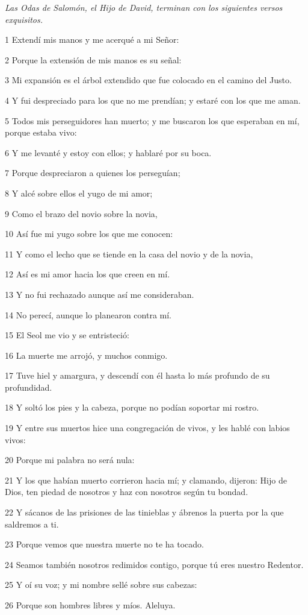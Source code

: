 \par \textit{Las Odas de Salomón, el Hijo de David, terminan con los siguientes versos exquisitos.}

\par 1 Extendí mis manos y me acerqué a mi Señor:
\par 2 Porque la extensión de mis manos es su señal:
\par 3 Mi expansión es el árbol extendido que fue colocado en el camino del Justo.
\par 4 Y fui despreciado para los que no me prendían; y estaré con los que me aman.
\par 5 Todos mis perseguidores han muerto; y me buscaron los que esperaban en mí, porque estaba vivo:
\par 6 Y me levanté y estoy con ellos; y hablaré por su boca.
\par 7 Porque despreciaron a quienes los perseguían;
\par 8 Y alcé sobre ellos el yugo de mi amor;
\par 9 Como el brazo del novio sobre la novia,
\par 10 Así fue mi yugo sobre los que me conocen:
\par 11 Y como el lecho que se tiende en la casa del novio y de la novia,
\par 12 Así es mi amor hacia los que creen en mí.
\par 13 Y no fui rechazado aunque así me consideraban.
\par 14 No perecí, aunque lo planearon contra mí.
\par 15 El Seol me vio y se entristeció:
\par 16 La muerte me arrojó, y muchos conmigo.
\par 17 Tuve hiel y amargura, y descendí con él hasta lo más profundo de su profundidad.
\par 18 Y soltó los pies y la cabeza, porque no podían soportar mi rostro.
\par 19 Y entre sus muertos hice una congregación de vivos, y les hablé con labios vivos:
\par 20 Porque mi palabra no será nula:
\par 21 Y los que habían muerto corrieron hacia mí; y clamando, dijeron: Hijo de Dios, ten piedad de nosotros y haz con nosotros según tu bondad.
\par 22 Y sácanos de las prisiones de las tinieblas y ábrenos la puerta por la que saldremos a ti.
\par 23 Porque vemos que nuestra muerte no te ha tocado.
\par 24 Seamos también nosotros redimidos contigo, porque tú eres nuestro Redentor.
\par 25 Y oí su voz; y mi nombre sellé sobre sus cabezas:
\par 26 Porque son hombres libres y míos. Aleluya.


